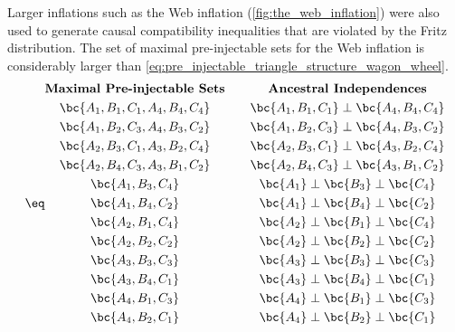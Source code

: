 \documentclass[aps, 10pt, english, twoside, pra, nofootinbib, tightenlines, longbibliography, superscriptaddress]{revtex4-1}
\begin{document}
    Larger inflations such as the Web inflation (\cref{fig:the_web_inflation}) were also used to generate causal compatibility inequalities that are violated by the Fritz distribution. The set of maximal pre-injectable sets for the Web inflation is considerably larger than \cref{eq:pre_injectable_triangle_structure_wagon_wheel}.
    \begin{equation*}
        \eq \label{eq:pre_injectable_triangle_structure_web}
        \begin{gathered}
            \textbf{Maximal Pre-injectable Sets} \\
            \bc{A_1, B_1, C_1, A_4, B_4, C_4} \\
            \bc{A_1, B_2, C_3, A_4, B_3, C_2} \\
            \bc{A_2, B_3, C_1, A_3, B_2, C_4} \\
            \bc{A_2, B_4, C_3, A_3, B_1, C_2} \\
            \bc{A_1, B_3, C_4} \\
            \bc{A_1, B_4, C_2} \\
            \bc{A_2, B_1, C_4} \\
            \bc{A_2, B_2, C_2} \\
            \bc{A_3, B_3, C_3} \\
            \bc{A_3, B_4, C_1} \\
            \bc{A_4, B_1, C_3} \\
            \bc{A_4, B_2, C_1}
        \end{gathered}
        \qquad
        \begin{gathered}
            \textbf{Ancestral Independences} \\
            \bc{A_1, B_1, C_1} \ancestralindep \bc{A_4, B_4, C_4} \\
            \bc{A_1, B_2, C_3} \ancestralindep \bc{A_4, B_3, C_2} \\
            \bc{A_2, B_3, C_1} \ancestralindep \bc{A_3, B_2, C_4} \\
            \bc{A_2, B_4, C_3} \ancestralindep \bc{A_3, B_1, C_2} \\
            \bc{A_1} \ancestralindep \bc{B_3} \ancestralindep \bc{C_4} \\
            \bc{A_1} \ancestralindep \bc{B_4} \ancestralindep \bc{C_2} \\
            \bc{A_2} \ancestralindep \bc{B_1} \ancestralindep \bc{C_4} \\
            \bc{A_2} \ancestralindep \bc{B_2} \ancestralindep \bc{C_2} \\
            \bc{A_3} \ancestralindep \bc{B_3} \ancestralindep \bc{C_3} \\
            \bc{A_3} \ancestralindep \bc{B_4} \ancestralindep \bc{C_1} \\
            \bc{A_4} \ancestralindep \bc{B_1} \ancestralindep \bc{C_3} \\
            \bc{A_4} \ancestralindep \bc{B_2} \ancestralindep \bc{C_1}
        \end{gathered}
    \end{equation*}
\end{document}
